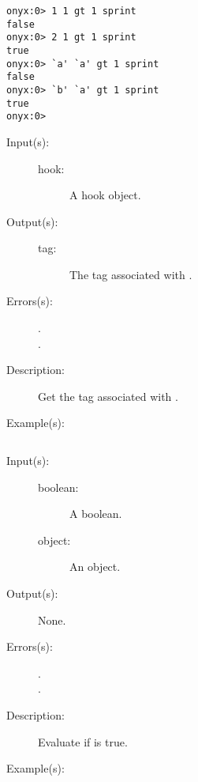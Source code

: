 \begin{description}
\begin{description}
\begin{verbatim}
onyx:0> 1 1 gt 1 sprint
false
onyx:0> 2 1 gt 1 sprint
true
onyx:0> `a' `a' gt 1 sprint
false
onyx:0> `b' `a' gt 1 sprint
true
onyx:0>
		\end{verbatim}
	\end{description}
\label{systemdict:hooktag}
\item[{\onyxop{hook}{hooktag}{tag}}: ]
	\begin{description}\item[]
	\item[Input(s): ]
		\begin{description}\item[]
		\item[hook: ]
			A hook object.
		\end{description}
	\item[Output(s): ]
		\begin{description}\item[]
		\item[tag: ]
			The tag associated with .
		\end{description}
	\item[Errors(s): ]
		\begin{description}\item[]
		\item[.]
		\item[.]
		\end{description}
	\item[Description: ]
		Get the tag associated with .
	\item[Example(s): ]\begin{verbatim}

		\end{verbatim}
	\end{description}
\label{systemdict:if}
\item[{\onyxop{boolean object}{if}{--}}: ]
	\begin{description}\item[]
	\item[Input(s): ]
		\begin{description}\item[]
		\item[boolean: ]
			A boolean.
		\item[object: ]
			An object.
		\end{description}
	\item[Output(s): ] None.
	\item[Errors(s): ]
		\begin{description}\item[]
		\item[.]
		\item[.]
		\end{description}
	\item[Description: ]
		Evaluate  if  is true.
	\item[Example(s): ]\begin{verbatim}


\end{verbatim}
\end{description}
\end{description}
